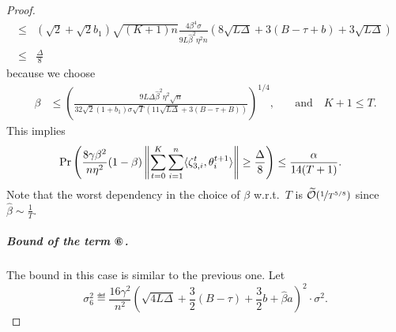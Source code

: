 \documentclass[a4paper,11pt]{article}
\begin{document}
\begin{proof}
\begin{align*}
    \le &(\sqrt{2}+\sqrt{2}b_1)\sqrt{(K+1)n}\frac{4\beta^{4}\sigma}{9L\hat{\beta}^2\eta^2n}\left(8\sqrt{L\Delta} + 3(B-\tau +b)+ 3\sqrt{L\Delta}\right)\\
    \le& \frac{\Delta}{8}   
    \end{align*}
    because we choose
    \begin{align}\label{eq:stepsize_bound_7}
    \beta &\le \left(\frac{9L\Delta\hat{\beta}^2\eta^2\sqrt{n}}{32\sqrt{2}(1+b_1)\sigma\sqrt{T}\left(11\sqrt{L\Delta} + 3(B-\tau+B)\right)}\right)^{1/4},
    &\quad \text{and} \quad K+1 \le T.
    \end{align}
    This implies 
    \begin{align*}
    &\Pr\left(\frac{8\gamma\beta^2}{n\eta^2}(1-\beta)\left\|\sum_{t=0}^K\sum_{i=1}^n\<\zeta_{3,i}^t,\theta^{t+1}_i>\right\| \ge \frac{\Delta}{8}\right) \le \frac{\alpha}{14(T+1)}.
    \end{align*}
    Note that the worst dependency in the choice of $\beta$ w.r.t.\ $T$ is $\widetilde{\mathcal O}(\nicefrac{1}{T^{5/8}})$ since $\hat{\beta} \sim \frac{1}{T}.$
    
   
     \subparagraph{Bound of the term $\circledSix$.} The bound in this case is similar to the previous one. Let
     \[
        \sigma_6^2 \eqdef \frac{16\gamma^2}{n^2}\left(\sqrt{4L\Delta} +\frac{3}{2}(B-\tau) + \frac{3}{2}b + \hat{\beta}a\right)^2\cdot \sigma^2.
     \]
      

\end{proof}
\end{document}
